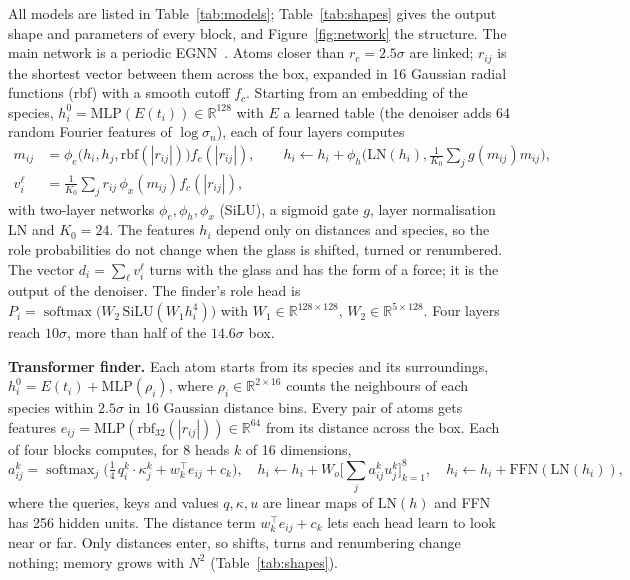 \documentclass[10pt]{article}
\begin{document}



All models are listed in Table~\ref{tab:models}; Table~\ref{tab:shapes} gives the output shape and parameters of every block, and Figure~\ref{fig:network} the structure. The main network is a periodic EGNN~\citep{satorras2021egnn}. Atoms closer than $r_c=2.5\sigma$ are linked; $r_{ij}$ is the shortest vector between them across the box, expanded in 16 Gaussian radial functions (rbf) with a smooth cutoff $f_c$. Starting from an embedding of the species, $h_i^0=\mathrm{MLP}(E(t_i))\in\mathbb R^{128}$ with $E$ a learned table (the denoiser adds 64 random Fourier features of $\log\sigma_n$), each of four layers computes
\begin{equation}
\begin{aligned}
m_{ij}&=\phi_e\big(h_i,h_j,\mathrm{rbf}(|r_{ij}|)\big)f_c(|r_{ij}|),\qquad
h_i\leftarrow h_i+\phi_h\Big(\mathrm{LN}(h_i),\tfrac{1}{K_0}\textstyle\sum_j g(m_{ij})m_{ij}\Big),\\
v_i^\ell&=\tfrac{1}{K_0}\textstyle\sum_j r_{ij}\,\phi_x(m_{ij})f_c(|r_{ij}|),
\end{aligned}
\label{eq:layer}
\end{equation}
with two-layer networks $\phi_e,\phi_h,\phi_x$ (SiLU), a sigmoid gate $g$, layer normalisation LN and $K_0=24$. The features $h_i$ depend only on distances and species, so the role probabilities do not change when the glass is shifted, turned or renumbered. The vector $d_i=\sum_\ell v_i^\ell$ turns with the glass and has the form of a force; it is the output of the denoiser. The finder's role head is $P_i=\operatorname{softmax}\big(W_2\,\mathrm{SiLU}(W_1h_i^4)\big)$ with $W_1\in\mathbb R^{128\times128}$, $W_2\in\mathbb R^{5\times128}$. Four layers reach $10\sigma$, more than half of the $14.6\sigma$ box.

\textbf{Transformer finder.} Each atom starts from its species and its surroundings, $h_i^0=E(t_i)+\mathrm{MLP}(\rho_i)$, where $\rho_i\in\mathbb R^{2\times16}$ counts the neighbours of each species within $2.5\sigma$ in 16 Gaussian distance bins. Every pair of atoms gets features $e_{ij}=\mathrm{MLP}(\mathrm{rbf}_{32}(|r_{ij}|))\in\mathbb R^{64}$ from its distance across the box. Each of four blocks computes, for 8 heads $k$ of 16 dimensions,
\begin{equation}
a^{k}_{ij}=\operatorname{softmax}_j\Big(\tfrac{1}{4}\,q_i^{k}\cdot \kappa_j^{k}+w_k^\top e_{ij}+c_k\Big),\quad
h_i\leftarrow h_i+W_o\big[\textstyle\sum_j a^k_{ij}u_j^k\big]_{k=1}^{8},\quad
h_i\leftarrow h_i+\mathrm{FFN}(\mathrm{LN}(h_i)),
\label{eq:attention}
\end{equation}
where the queries, keys and values $q,\kappa,u$ are linear maps of $\mathrm{LN}(h)$ and FFN has 256 hidden units. The distance term $w_k^\top e_{ij}+c_k$ lets each head learn to look near or far. Only distances enter, so shifts, turns and renumbering change nothing; memory grows with $N^2$ (Table~\ref{tab:shapes}).
\end{document}
